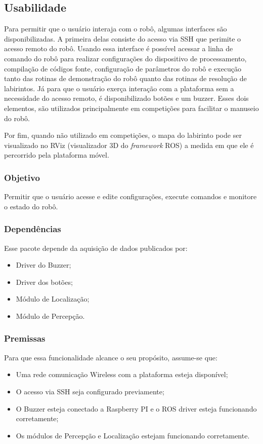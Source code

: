 \subsection{Usabilidade}
\label{ssec:funcionalidade_usabilidade} 
Para permitir que o usuário interaja com o robô, algumas interfaces são disponibilizadas. A primeira delas consiste do acesso via SSH que perimite o acesso remoto do robô. Usando essa interface é possível acessar a linha de comando do robô para realizar configurações do dispositivo de processamento, compilação de códigos fonte, configuração de parâmetros do robô e execução tanto das rotinas de demonstração do robô quanto das rotinas de resolução de labirintos. Já para que o usuário exerça interação com a plataforma sem a necessidade do acesso remoto, é disponibilizado botões e um buzzer. Esses dois elementos, são utilizados principalmente em competições para facilitar o manuseio do robô.
 
Por fim, quando não utilizado em competições, o mapa do labirinto pode ser visualizado no RViz (visualizador 3D do \textit{framework} ROS) a medida em que ele é percorrido pela plataforma móvel.

\subsubsection{Objetivo}
Permitir que o usuário acesse e edite configurações, execute comandos e monitore o estado do robô.

\subsubsection{Dependências}
Esse pacote depende da aquisição de dados publicados por:
\begin{itemize}
	\item Driver do Buzzer;
	\item Driver dos botões;
	\item Módulo de Localização;
	\item Módulo de Percepção.
\end{itemize}

\subsubsection{Premissas}
Para que essa funcionalidade alcance o seu propósito, assume-se que:
\begin{itemize}
	\item Uma rede comunicação Wireless com a plataforma esteja disponível;
	\item O acesso via SSH seja configurado previamente;
	\item O Buzzer esteja conectado a Raspberry PI e o ROS driver esteja funcionando corretamente;
	\item  Os módulos de Percepção e Localização estejam funcionando corretamente.
\end{itemize}

